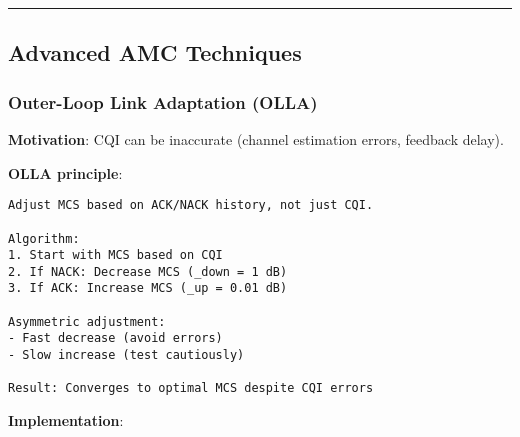 \begin{center}\rule{0.5\linewidth}{0.5pt}\end{center}

\subsection{Advanced AMC Techniques}\label{advanced-amc-techniques}

\subsubsection{Outer-Loop Link Adaptation
(OLLA)}\label{outer-loop-link-adaptation-olla}

\textbf{Motivation}: CQI can be inaccurate (channel estimation errors,
feedback delay).

\textbf{OLLA principle}:

\begin{verbatim}
Adjust MCS based on ACK/NACK history, not just CQI.

Algorithm:
1. Start with MCS based on CQI
2. If NACK: Decrease MCS (_down = 1 dB)
3. If ACK: Increase MCS (_up = 0.01 dB)

Asymmetric adjustment:
- Fast decrease (avoid errors)
- Slow increase (test cautiously)

Result: Converges to optimal MCS despite CQI errors
\end{verbatim}

\textbf{Implementation}:

